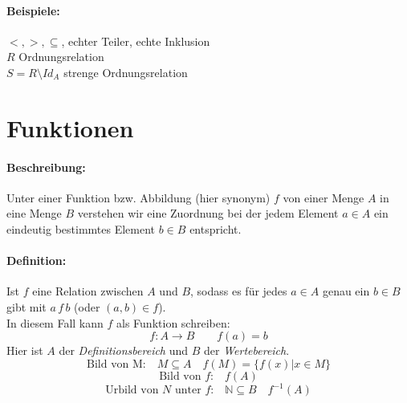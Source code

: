 \documentclass[10pt,a4paper]{article}
\begin{document}
\paragraph{Beispiele:}$<,>,\subseteq$, \glqq echter Teiler\grqq , \glqq echte Inklusion\grqq
\ \\
$R$ Ordnungsrelation\\
$S=R\setminus Id_A$ strenge Ordnungsrelation

\section{Funktionen}
\paragraph{Beschreibung:}Unter einer Funktion bzw. Abbildung (hier synonym) $f$ von einer Menge $A$ in eine Menge $B$ verstehen wir eine Zuordnung bei der jedem Element $a\in A$ ein eindeutig bestimmtes Element $b\in B$ entspricht.
\paragraph{Definition:}Ist $f$ eine Relation zwischen $A$ und $B$, sodass es für jedes $a\in A$ genau ein $b\in B$ gibt mit $a\, f\, b$ (oder $(a,b)\in f$).\\
In diesem Fall kann $f$ als Funktion schreiben:
\[
f:A\rightarrow B \qquad f(a)=b
\]
Hier ist $A$ der \emph{Definitionsbereich} und $B$ der \emph{Wertebereich}.
\[
\text{Bild von M:} \quad M\subseteq A \quad f(M) = \{f(x) | x\in M\}
\]
\[
\text{Bild von $f$:} \quad f(A)
\]
\[
\text{Urbild von $N$ unter $f$:} \quad \mathbb{N}\subseteq B \quad f^{-1}(A)
\]
\end{document}
